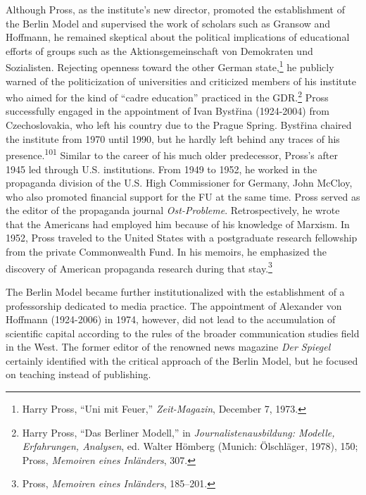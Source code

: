 \documentclass{tufte-handout}
\begin{document}
Although Pross, as the institute's new director, promoted the
establishment of the Berlin Model and supervised the work of scholars
such as Gransow and Hoffmann, he remained skeptical about the political
implications of educational efforts of groups such as the
Aktionsgemeinschaft von Demokraten und Sozialisten. Rejecting openness
toward the other German state,\footnote{Harry Pross, ``Uni mit Feuer,''
  \emph{Zeit-Magazin}, December 7, 1973.} he publicly warned of the
politicization of universities and criticized members of his institute
who aimed for the kind of ``cadre education'' practiced in the
GDR.\footnote{Harry Pross, ``Das Berliner Modell,'' in
  \emph{Journalistenausbildung: Modelle, Erfahrungen, Analysen}, ed.
  Walter Hömberg (Munich: Ölschläger, 1978), 150; Pross, \emph{Memoiren
  eines Inländers}, 307.} Pross successfully engaged in the appointment
of Ivan Bystřina (1924-2004) from Czechoslovakia, who left his country
due to the Prague Spring. Bystřina chaired the institute from 1970 until
1990, but he hardly left behind any traces of his presence.\textsuperscript{101}
Similar to the career of his much older predecessor, Pross's after 1945
led through U.S. institutions. From 1949 to 1952, he worked in the
propaganda division of the U.S. High Commissioner for Germany, John
McCloy, who also promoted financial support for the FU at the same time.
Pross served as the editor of the propaganda journal
\emph{Ost-Probleme}. Retrospectively, he wrote that the Americans had
employed him because of his knowledge of Marxism. In 1952, Pross
traveled to the United States with a postgraduate research fellowship
from the private Commonwealth Fund. In his memoirs, he emphasized the
discovery of American propaganda research during that stay.\footnote{Pross,
  \emph{Memoiren eines Inländers}, 185--201.}

The Berlin Model became further institutionalized with the establishment
of a professorship dedicated to media practice. The appointment of
Alexander von Hoffmann (1924-2006) in 1974, however, did not lead to the
accumulation of scientific capital according to the rules of the broader
communication studies field in the West. The former editor of the
renowned news magazine \emph{Der Spiegel} certainly identified with the
critical approach of the Berlin Model, but he focused on teaching
instead of publishing.
\end{document}
